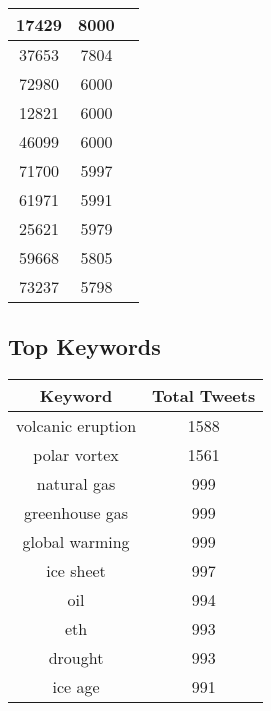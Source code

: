\documentclass{article}\usepackage[T1]{fontenc}
\begin{document}
\begin{tabular}{|c|c|c|}
 \hline
17429 & 8000\\ 
 \hline
37653 & 7804\\ 
 \hline
72980 & 6000\\ 
 \hline
12821 & 6000\\ 
 \hline
46099 & 6000\\ 
 \hline
71700 & 5997\\ 
 \hline
61971 & 5991\\ 
 \hline
25621 & 5979\\ 
 \hline
59668 & 5805\\ 
 \hline
73237 & 5798\\ 
 \hline
\end{tabular}\subsection*{Top Keywords}\begin{tabular}{|c|c|}         \hline         Keyword & Total Tweets \\ 
 \hline
volcanic eruption & 1588\\ 
 \hline
polar vortex & 1561\\ 
 \hline
natural gas & 999\\ 
 \hline
greenhouse gas & 999\\ 
 \hline
global warming & 999\\ 
 \hline
ice sheet & 997\\ 
 \hline
oil & 994\\ 
 \hline
eth & 993\\ 
 \hline
drought & 993\\ 
 \hline
ice age & 991\\ 
 \hline
\end{tabular}
\end{document}
